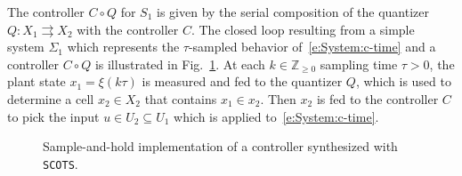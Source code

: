 \documentclass[a4paper]{amsart}
\newcommand{\segcc}[1]{\ensuremath{{\left\llbracket#1\right\rrbracket}}}
\newcommand{\Z}{\mathbb{Z}}
\begin{document}
The controller $C\circ Q$ for $S_1$ is given by the serial composition of the quantizer
$Q:X_1\rightrightarrows X_2$ with the controller $C$. 
The closed loop resulting from a simple system $\Sigma_1$ which represents the $\tau$-sampled
behavior of~\eqref{e:System:c-time} and a controller $C\circ Q$ is illustrated
in Fig.~\ref{f:closedloop}. At each $k\in\Z_{\ge0}$ sampling
time $\tau>0$, the plant state $x_1=\xi(k\tau)$ is measured and fed to the
quantizer $Q$, which is used to determine a cell $x_2\in X_2$ that contains
$x_1\in x_2$. Then $x_2$ is fed to the controller $C$ to pick the input $u\in
U_2\subseteq U_1$ which is applied to~\eqref{e:System:c-time}.
\begin{figure}[h]
  \centering
\caption{Sample-and-hold implementation of a controller synthesized with {\tt SCOTS}.}\label{f:closedloop}
\end{figure}

%
\end{document}
